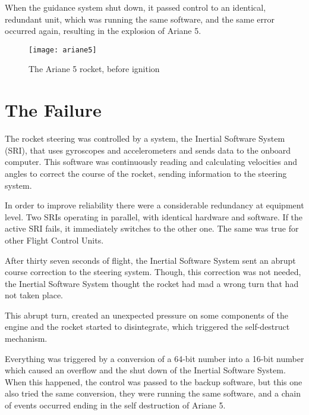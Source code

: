 \documentclass[
12pt, %
a4paper, %
oneside, %
headinclude,footinclude, %
BCOR5mm, %
]{scrartcl}
\begin{document}
When the guidance system shut down, it passed control to an identical, redundant unit, which was running the same software, and the same error occurred again, resulting in the explosion of Ariane 5.

\begin{figure}[tb]
	\centering 
	\texttt{[image: ariane5]} 
	\caption[The Ariane 5 rocket]{The Ariane 5 rocket, before ignition \cite{hownottocode:2016}} %
	\label{fig:arianefive} 
\end{figure}

 

\section{The Failure}


The rocket steering was controlled by a system, the Inertial Software System (SRI), that uses gyroscopes and accelerometers and sends data to the onboard computer. This software was continuously reading and calculating velocities and angles to correct the course of the rocket, sending information to the steering system.

In order to improve reliability there were a considerable redundancy at  equipment level. Two SRIs operating in parallel, with identical  hardware and software. If the active SRI fails, it immediately switches to the other one. The same was true for other Flight Control Units.

After thirty seven seconds of flight, the Inertial Software System sent an abrupt course correction to the steering system. Though, this correction was not needed, the Inertial Software System thought the rocket had mad a wrong  turn that had not taken place. 

This abrupt turn, created an unexpected pressure on some components of the engine and the rocket started to disintegrate, which triggered the self-destruct mechanism.

Everything was triggered by a conversion of a 64-bit number into a 16-bit number which caused an overflow and the shut down of the Inertial Software System. When this happened, the control was passed to the backup software, but this one also tried the same conversion, they were running the same  software, and a chain of events occurred ending in the self destruction of Ariane 5.
\end{document}
